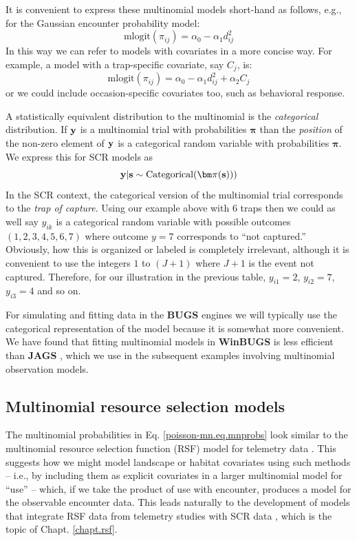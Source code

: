 It is convenient to express these multinomial models short-hand as
follows, e.g., for the Gaussian encounter probability model:
\[
\mbox{mlogit}( \pi_{ij} ) = \alpha_{0} - \alpha_{1} d_{ij}^{2}
\]
In this way we can refer to models with covariates in a more concise
way. For example, a model with a trap-specific covariate, say $C_{j}$, is:
\[
\mbox{mlogit}( \pi_{ij} ) = \alpha_{0} - \alpha_{1} d_{ij}^{2} + \alpha_{2} C_{j}
\]
or we could include occasion-specific covariates too, such as
behavioral response.

A statistically equivalent distribution to the multinomial is the {\it
  categorical} distribution.  If ${\bf y}$ is a multinomial trial with
probabilities ${\bm \pi}$ than the {\it position} of the non-zero
element of ${\bf y}$ is a categorical random variable with
probabilities ${\bm \pi}$.  We express this for SCR models as
\[
{\bf y}|{\bf s} \sim \mbox{Categorical}( {\bm \pi}({\bf s})) )
\]
In the SCR context, the categorical version of the multinomial trial
corresponds to the {\it trap of capture}.  Using our example above
with 6 traps then we could as well say $y_{ik}$ is a categorical
random variable with possible outcomes $(1,2,3,4,5,6,7)$ where outcome
$y=7$ corresponds to ``not captured.'' Obviously, how this is
organized or labeled is completely irrelevant, although it is
convenient to use the integers $1$ to $(J+1)$ where $J+1$ is the event
not captured.  Therefore, for our illustration in the previous table,
$y_{i1} = 2$, $y_{i2} = 7$, $y_{i3} = 4$ and so on.

For simulating and fitting data in the {\bf BUGS} engines we will
typically use the categorical representation of the model because it
is somewhat more convenient.  We have found that fitting multinomial
models in {\bf WinBUGS} is less efficient than {\bf JAGS}
\citep{royle_converse:2013}, which we use in the subsequent examples
involving multinomial observation models.


\subsection{Multinomial  resource selection models}

The multinomial probabilities in Eq. \ref{poisson-mn.eq.mnprobs} look
similar to the multinomial resource selection function (RSF) model for
telemetry data \citep{manly_etal:2002, lele_keim:2006}.  This suggests
how we might model landscape or habitat covariates using such methods
-- i.e., by including them as explicit covariates in a larger
multinomial model for ``use'' -- which, if we take the product of use
with encounter, produces a model for the observable encounter
data. This leads naturally to the development of models that integrate
RSF data from telemetry studies with SCR data
\citep{royle_etal:2012mee}, which is the topic of
Chapt. \ref{chapt.rsf}.



